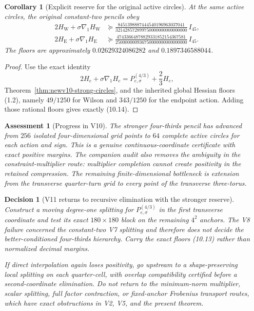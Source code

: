 \documentclass[11pt,oneside]{article}
\newtheorem{corollary}[theorem]{Corollary}
\newtheorem{assessment}[theorem]{Assessment}
\newtheorem{decision}[theorem]{Decision}
\theoremstyle{definition}
\theoremstyle{remark}
\begin{document}
\begin{corollary}[Explicit reserve for the original active circles]
\label{cor:newv10-original-circles}
At the same active circles, the original constant-two pencils obey
\[
\begin{aligned}
 2H_{\mathrm W}+\sigma\nabla_1H_{\mathrm W}
 &\succeq
 \frac{8451398887444540196963037041}
 {321428572899750000000000000000}\,I_{45},\\
 2H_{\mathrm E}+\sigma\nabla_1H_{\mathrm E}
 &\succeq
 \frac{47433664878829331852154367581}
 {250000000936750000000000000000}\,I_{45}.
\end{aligned}                                             \tag{10.17}
\]
The floors are approximately \(0.02629324086282\) and
\(0.1897346588044\).
\end{corollary}

\begin{proof}
Use the exact identity
\[
 2H_e+\sigma\nabla_1H_e
 =P^{(4/3)}_{e,\sigma}+\frac23H_e,                        \tag{10.18}
\]
Theorem~\ref{thm:newv10-strong-circles}, and the inherited global
Hessian floors (1.2), namely \(49/1250\) for Wilson and \(343/1250\)
for the endpoint action.  Adding those rational floors gives exactly
(10.14).
\end{proof}

\begin{assessment}[Progress in V10]
\label{ass:newv10-progress}
The stronger four-thirds pencil has advanced from \(256\) isolated
four-dimensional grid points to \(64\) complete active circles for
each action and sign.  This is a genuine continuous-coordinate
certificate with exact positive margins.  The companion audit also
removes the ambiguity in the constraint-multiplier route: multiplier
completion cannot create positivity in the retained compression.
The remaining finite-dimensional bottleneck is extension from the
transverse quarter-turn grid to every point of the transverse
three-torus.
\end{assessment}

\begin{decision}[V11 returns to recursive elimination with the stronger reserve]
\label{dec:newv10-next}
Construct a moving degree-one splitting for
\(P^{(4/3)}_{e,\sigma}\) in the first transverse coordinate and test
its exact \(180\times180\) block on the remaining \(4^2\) anchors.
The V8 failure concerned the constant-two V7 splitting and therefore
does not decide the better-conditioned four-thirds hierarchy.  Carry
the exact floors (10.13) rather than normalized decimal margins.

If direct interpolation again loses positivity, go upstream to a
shape-preserving local splitting on each quarter-cell, with overlap
compatibility certified before a second-coordinate elimination.  Do
not return to the minimum-norm multiplier, scalar splitting, full
factor contraction, or fixed-anchor Frobenius transport routes,
which have exact obstructions in V2, V5, and the present theorem.
\end{decision}
\end{document}
